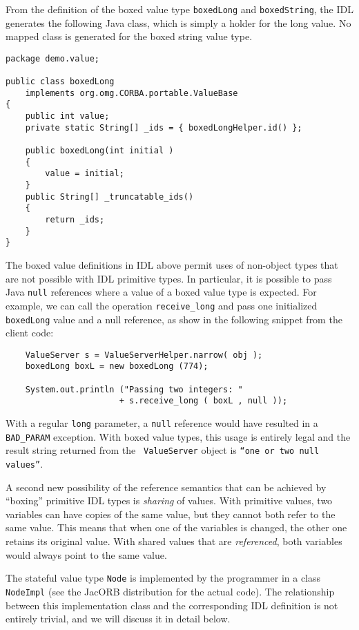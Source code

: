 From the definition of the  boxed value type {\tt boxedLong} and
{\tt boxedString}, the IDL generates the following Java class, which
is simply a holder for the long value. No mapped class is generated
for the boxed string value type.

\begin{verbatim}
package demo.value;

public class boxedLong
    implements org.omg.CORBA.portable.ValueBase
{
    public int value;
    private static String[] _ids = { boxedLongHelper.id() };

    public boxedLong(int initial )
    {
        value = initial;
    }
    public String[] _truncatable_ids()
    {
        return _ids;
    }
}
\end{verbatim}

The boxed value definitions in IDL above permit uses of non-object
types that are not possible with IDL primitive types. In particular, it
is possible to pass Java {\tt null} references where a value of a
boxed value type is expected. For example, we can call the operation
{\tt receive\_long} and pass one initialized {\tt boxedLong} value and
a null reference, as show in the following snippet from the client
code:

\begin{verbatim}
    ValueServer s = ValueServerHelper.narrow( obj );
    boxedLong boxL = new boxedLong (774);

    System.out.println ("Passing two integers: "
                       + s.receive_long ( boxL , null ));
\end{verbatim}

With a regular {\tt long} parameter, a {\tt null} reference would have
resulted in a {\tt BAD\_PARAM} exception. With boxed value types, this
usage is entirely legal and the result string returned from the {\tt
  ValueServer} object is {\tt ``one or two null values''}.

A second new possibility of the reference semantics that can be
achieved by ``boxing'' primitive IDL types is {\em sharing} of values.
With primitive values, two variables can have copies of the same
value, but they cannot both refer to the same value. This means that
when one of the variables is changed, the other one retains its
original value. With shared values that are {\em referenced}, both
variables would always point to the same value.

The stateful value type {\tt Node} is implemented by the programmer in
a class {\tt NodeImpl} (see the JacORB distribution for the actual
code).  The relationship between this implementation class and the
corresponding IDL definition is not entirely trivial, and we will
discuss it in detail below.

